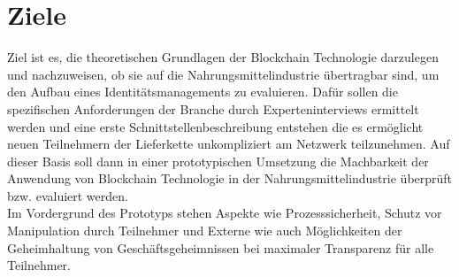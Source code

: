 \section{Ziele}

Ziel ist es, die theoretischen Grundlagen der Blockchain Technologie darzulegen und nachzuweisen, ob sie auf die Nahrungsmittelindustrie übertragbar sind, um den Aufbau eines Identitätsmanagements zu evaluieren. Dafür sollen die spezifischen Anforderungen der Branche durch Experteninterviews ermittelt werden und eine erste Schnittstellenbeschreibung entstehen die es ermöglicht neuen Teilnehmern der Lieferkette unkompliziert am Netzwerk teilzunehmen. Auf dieser Basis soll dann in einer prototypischen Umsetzung die Machbarkeit der Anwendung von Blockchain Technologie in der Nahrungsmittelindustrie überprüft bzw. evaluiert werden.\\

Im Vordergrund des Prototyps stehen Aspekte wie Prozesssicherheit, Schutz vor Manipulation durch Teilnehmer und Externe wie auch Möglichkeiten der Geheimhaltung von Geschäftsgeheimnissen bei maximaler Transparenz für alle Teilnehmer.\\


\newpage
